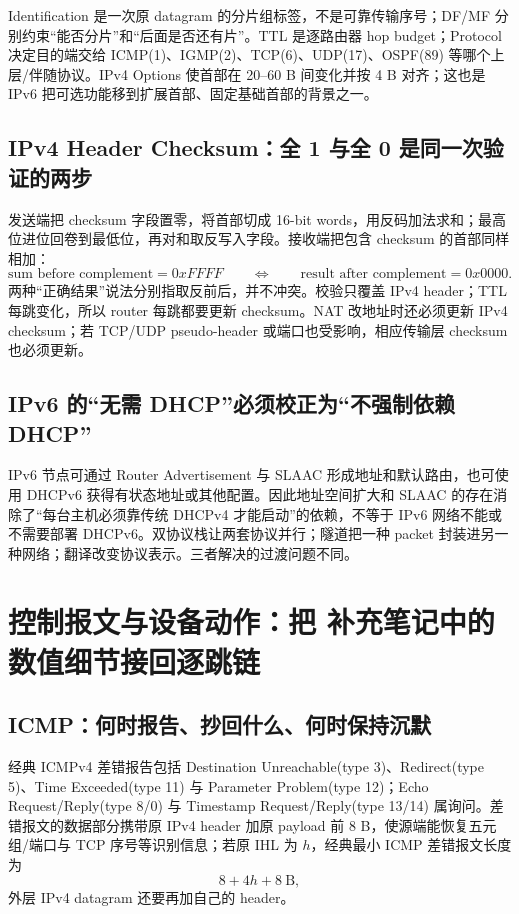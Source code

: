 \documentclass[11pt,a4paper]{ctexart}
\begin{document}
Identification 是一次原 datagram 的分片组标签，不是可靠传输序号；DF/MF 分别约束“能否分片”和“后面是否还有片”。TTL 是逐路由器 hop budget；Protocol 决定目的端交给 ICMP(1)、IGMP(2)、TCP(6)、UDP(17)、OSPF(89) 等哪个上层/伴随协议。IPv4 Options 使首部在 20--60 B 间变化并按 4 B 对齐；这也是 IPv6 把可选功能移到扩展首部、固定基础首部的背景之一。

\subsection{IPv4 Header Checksum：全 1 与全 0 是同一次验证的两步}

发送端把 checksum 字段置零，将首部切成 16-bit words，用反码加法求和；最高位进位回卷到最低位，再对和取反写入字段。接收端把包含 checksum 的首部同样相加：
\[
\boxed{\text{sum before complement}=0xFFFF}
\qquad\Longleftrightarrow\qquad
\boxed{\text{result after complement}=0x0000}.
\]
两种“正确结果”说法分别指取反前后，并不冲突。校验只覆盖 IPv4 header；TTL 每跳变化，所以 router 每跳都要更新 checksum。NAT 改地址时还必须更新 IPv4 checksum；若 TCP/UDP pseudo-header 或端口也受影响，相应传输层 checksum 也必须更新。

\subsection{IPv6 的“无需 DHCP”必须校正为“不强制依赖 DHCP”}

IPv6 节点可通过 Router Advertisement 与 SLAAC 形成地址和默认路由，也可使用 DHCPv6 获得有状态地址或其他配置。因此地址空间扩大和 SLAAC 的存在消除了“每台主机必须靠传统 DHCPv4 才能启动”的依赖，不等于 IPv6 网络不能或不需要部署 DHCPv6。双协议栈让两套协议并行；隧道把一种 packet 封装进另一种网络；翻译改变协议表示。三者解决的过渡问题不同。

\section{控制报文与设备动作：把 补充笔记中的数值细节接回逐跳链}

\subsection{ICMP：何时报告、抄回什么、何时保持沉默}

经典 ICMPv4 差错报告包括 Destination Unreachable(type 3)、Redirect(type 5)、Time Exceeded(type 11) 与 Parameter Problem(type 12)；Echo Request/Reply(type 8/0) 与 Timestamp Request/Reply(type 13/14) 属询问。差错报文的数据部分携带原 IPv4 header 加原 payload 前 8 B，使源端能恢复五元组/端口与 TCP 序号等识别信息；若原 IHL 为 $h$，经典最小 ICMP 差错报文长度为
\[
8+4h+8\ \mathrm{B},
\]
外层 IPv4 datagram 还要再加自己的 header。
\end{document}
